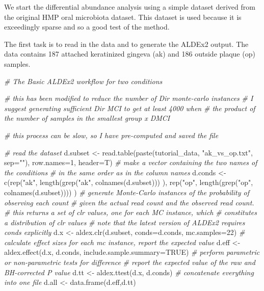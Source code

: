 \documentclass[
  onecolumn]{article}
\newenvironment{Shaded}{\begin{snugshade}}{\end{snugshade}}
\newcommand{\AttributeTok}[1]{\textcolor[rgb]{0.77,0.63,0.00}{#1}}
\newcommand{\CommentTok}[1]{\textcolor[rgb]{0.56,0.35,0.01}{\textit{#1}}}
\newcommand{\ConstantTok}[1]{\textcolor[rgb]{0.00,0.00,0.00}{#1}}
\newcommand{\DecValTok}[1]{\textcolor[rgb]{0.00,0.00,0.81}{#1}}
\newcommand{\FunctionTok}[1]{\textcolor[rgb]{0.00,0.00,0.00}{#1}}
\newcommand{\NormalTok}[1]{#1}
\newcommand{\OtherTok}[1]{\textcolor[rgb]{0.56,0.35,0.01}{#1}}
\newcommand{\StringTok}[1]{\textcolor[rgb]{0.31,0.60,0.02}{#1}}
\begin{document}
We start the differential abundance analysis using a simple dataset derived from the original HMP oral microbiota dataset. This dataset is used because it is exceedingly sparse and so a good test of the method.

The first task is to read in the data and to generate the ALDEx2 output. The data contains 187 attached keratinized gingeva (ak) and 186 outside plaque (op) samples.

\begin{Shaded}
\begin{Highlighting}[]
\CommentTok{\# The Basic ALDEx2 workflow for two conditions}

\CommentTok{\# this has been modified to reduce the number of Dir monte{-}carlo instances}
\CommentTok{\# I suggest generating sufficient Dir MCI to get at least 4000 when}
\CommentTok{\# the product of the number of samples in the smallest group x DMCI}

\CommentTok{\# this process can be slow, so I have pre{-}computed and saved the file}


\CommentTok{\# read the dataset}
\NormalTok{d.subset }\OtherTok{\textless{}{-}} \FunctionTok{read.table}\NormalTok{(}\FunctionTok{paste}\NormalTok{(tutorial\_data, }\StringTok{"ak\_vs\_op.txt"}\NormalTok{, }\AttributeTok{sep=}\StringTok{""}\NormalTok{),}
    \AttributeTok{row.names=}\DecValTok{1}\NormalTok{, }\AttributeTok{header=}\NormalTok{T)}
\CommentTok{\# make a vector containing the two names of the conditions}
\CommentTok{\# in the same order as in the column names}
\NormalTok{d.conds }\OtherTok{\textless{}{-}} \FunctionTok{c}\NormalTok{(}\FunctionTok{rep}\NormalTok{(}\StringTok{"ak"}\NormalTok{, }\FunctionTok{length}\NormalTok{(}\FunctionTok{grep}\NormalTok{(}\StringTok{"ak"}\NormalTok{, }\FunctionTok{colnames}\NormalTok{(d.subset))) ),}
    \FunctionTok{rep}\NormalTok{(}\StringTok{"op"}\NormalTok{, }\FunctionTok{length}\NormalTok{(}\FunctionTok{grep}\NormalTok{(}\StringTok{"op"}\NormalTok{, }\FunctionTok{colnames}\NormalTok{(d.subset)))) )}
\CommentTok{\# generate Monte{-}Carlo instances of the probability of observing each count}
\CommentTok{\# given the actual read count and the observed read count.}
\CommentTok{\# this returns a set of clr values, one for each MC instance, which}
\CommentTok{\# constitutes a distribution of clr values}
\CommentTok{\# note that the latest version of ALDEx2 requires conds explicitly}
\NormalTok{d.x }\OtherTok{\textless{}{-}} \FunctionTok{aldex.clr}\NormalTok{(d.subset, }\AttributeTok{conds=}\NormalTok{d.conds, }\AttributeTok{mc.samples=}\DecValTok{22}\NormalTok{)}
\CommentTok{\# calculate effect sizes for each mc instance, report the expected value}
\NormalTok{d.eff }\OtherTok{\textless{}{-}} \FunctionTok{aldex.effect}\NormalTok{(d.x, d.conds, }\AttributeTok{include.sample.summary=}\ConstantTok{TRUE}\NormalTok{)}
\CommentTok{\# perform parametric or non{-}parametric tests for difference}
\CommentTok{\# report the expected value of the raw and BH{-}corrected P value}
\NormalTok{d.tt }\OtherTok{\textless{}{-}} \FunctionTok{aldex.ttest}\NormalTok{(d.x, d.conds)}
\CommentTok{\# concatenate everything into one file}
\NormalTok{d.all }\OtherTok{\textless{}{-}} \FunctionTok{data.frame}\NormalTok{(d.eff,d.tt)}


\end{Highlighting}
\end{Shaded}
\end{document}
